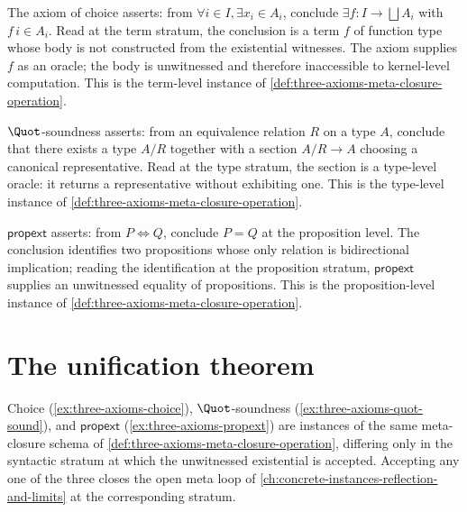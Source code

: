 \begin{example}
\label{ex:three-axioms-choice}
The axiom of choice asserts: from $\forall i \in I, \exists x_i \in A_i$, conclude $\exists f \colon I \to \bigsqcup A_i$ with $f\,i \in A_i$. Read at the term stratum, the conclusion is a term $f$ of function type whose body is not constructed from the existential witnesses. The axiom supplies $f$ as an oracle; the body is unwitnessed and therefore inaccessible to kernel-level computation. This is the term-level instance of \autoref{def:three-axioms-meta-closure-operation}.
\end{example}

\begin{example}
\label{ex:three-axioms-quot-sound}
$\Quot$-soundness asserts: from an equivalence relation $R$ on a type $A$, conclude that there exists a type $A / R$ together with a section $A / R \to A$ choosing a canonical representative. Read at the type stratum, the section is a type-level oracle: it returns a representative without exhibiting one. This is the type-level instance of \autoref{def:three-axioms-meta-closure-operation}.
\end{example}

\begin{example}
\label{ex:three-axioms-propext}
$\mathsf{propext}$ asserts: from $P \Leftrightarrow Q$, conclude $P = Q$ at the proposition level. The conclusion identifies two propositions whose only relation is bidirectional implication; reading the identification at the proposition stratum, $\mathsf{propext}$ supplies an unwitnessed equality of propositions. This is the proposition-level instance of \autoref{def:three-axioms-meta-closure-operation}.
\end{example}

\section{The unification theorem}
\label{sec:three-axioms-unification}

\begin{theorem}
\label{thm:three-axioms-unification}
Choice (\autoref{ex:three-axioms-choice}), $\Quot$-soundness (\autoref{ex:three-axioms-quot-sound}), and $\mathsf{propext}$ (\autoref{ex:three-axioms-propext}) are instances of the same meta-closure schema of \autoref{def:three-axioms-meta-closure-operation}, differing only in the syntactic stratum at which the unwitnessed existential is accepted. Accepting any one of the three closes the open meta loop of \autoref{ch:concrete-instances-reflection-and-limits} at the corresponding stratum.
\end{theorem}

